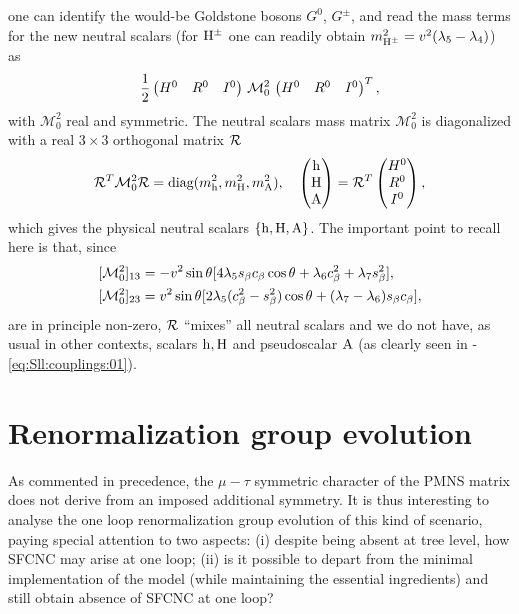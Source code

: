 \documentclass[12pt,a4paper]{article}
\begin{document}
 one can identify the would-be Goldstone bosons $G^0$, $G^\pm$, and read the mass terms for the new neutral scalars (for ${\rm H}^\pm$ one can readily obtain $m_{{\rm H}^\pm}^2=v_{}^2(\lambda_5-\lambda_4)$) as
 \begin{equation}
\frac{1}{2} \begin{pmatrix}{H}^0 & {R}^0 & {I}^0\end{pmatrix}\,\mathcal M_0^2\,\begin{pmatrix}{H}^0 & {R}^0 & {I}^0\end{pmatrix}^T,
 \end{equation}
with $\mathcal M_0^2$ real and symmetric. The neutral scalars mass matrix $\mathcal M_0^2$ is diagonalized with a real $3\times 3$ orthogonal matrix $\mathcal R$
\begin{equation}\label{eq:Scalar:R}
\mathcal R^T\mathcal M_0^2\mathcal R=\text{diag}(m_{{\rm h}}^2,m_{{\rm H}}^2,m_{{\rm A}}^2),\quad \begin{pmatrix}{\rm h}\\ {\rm H}\\ {\rm A}\end{pmatrix}=\mathcal R^T\begin{pmatrix}{H}^0 \\ {R}^0 \\ {I}^0\end{pmatrix},
\end{equation}
which gives the physical neutral scalars $\{{\rm h},{\rm H},{\rm A}\}$. 
The important point to recall here is that, since
\begin{equation}
\begin{aligned}
 &[\mathcal M_0^2]_{13}=-v_{}^2\sin\theta_{}[4\lambda_5s_\beta c_\beta\cos\theta_{}+\lambda_6c_\beta^2+\lambda_7s_\beta^2],\\
 &[\mathcal M_0^2]_{23}=v_{}^2\sin\theta_{}[2\lambda_5(c_\beta^2-s_\beta^2)\cos\theta_{}+(\lambda_7-\lambda_6)s_\beta c_\beta],
 \end{aligned}
\end{equation}
are in principle non-zero, $\mathcal R$ ``mixes'' all neutral scalars and we do not have, as usual in other contexts, scalars ${\rm h},{\rm H}$ and pseudoscalar ${\rm A}$ (as clearly seen in -\eqref{eq:Sll:couplings:01}).

\section{Renormalization group evolution\label{APP:RGE}}
As commented in precedence, the $\mu-\tau$ symmetric character of the PMNS matrix does not derive from an imposed additional symmetry. It is thus interesting to analyse the one loop renormalization group evolution of this kind of scenario, paying special attention to two aspects: (i) despite being absent at tree level, how SFCNC may arise at one loop; (ii) is it possible to depart from the minimal implementation of the model (while maintaining the essential ingredients) and still obtain absence of SFCNC at one loop?
\end{document}
